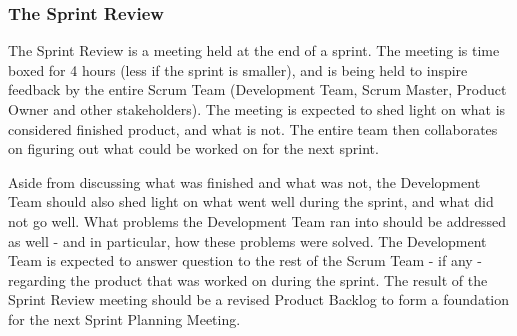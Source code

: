 \subsubsection{The Sprint Review}

The Sprint Review is a meeting held at the end of a sprint. The meeting is time boxed for 4 
hours (less if the sprint is smaller), and is being held to inspire feedback by the entire 
Scrum Team (Development Team, Scrum Master, Product Owner and other 
stakeholders)\cite{scrumguide11}. The meeting is expected to shed light on what is 
considered finished product, and what is not\cite{scrumguide11}. The entire team then 
collaborates on figuring out what could be worked on for the next sprint\cite{scrumguide11}. 


Aside from discussing what was finished and what was not, the Development Team should also 
shed light on what went well during the sprint, and what did not go well\cite{scrumguide11}. 
What problems the Development Team ran into should be addressed as well - and in particular, 
how these problems were solved\cite{scrumguide11}. The Development Team is expected to 
answer question to the rest of the Scrum Team - if any - regarding the product that was 
worked on during the sprint\cite{scrumguide11}. The result of the Sprint Review meeting 
should be a revised Product Backlog to form a foundation for the next Sprint Planning 
Meeting\cite{scrumguide11}.